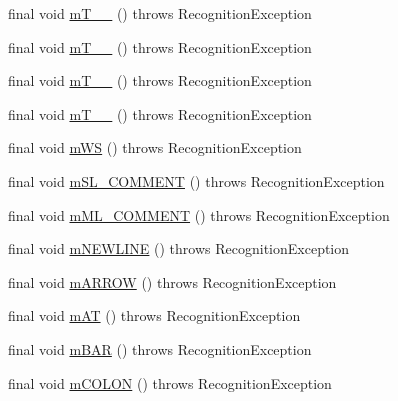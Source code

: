 \begin{DoxyCompactItemize}
\item 
final void \hyperlink{classorg_1_1tzi_1_1use_1_1parser_1_1testsuite_1_1_test_suite_lexer_a8580bb79c6cf585e638fa8e1e931825b}{m\-T\-\_\-\-\_} ()  throws Recognition\-Exception 
\item 
final void \hyperlink{classorg_1_1tzi_1_1use_1_1parser_1_1testsuite_1_1_test_suite_lexer_a0285d18094fc66d87d8b0c697b28322c}{m\-T\-\_\-\-\_} ()  throws Recognition\-Exception 
\item 
final void \hyperlink{classorg_1_1tzi_1_1use_1_1parser_1_1testsuite_1_1_test_suite_lexer_af7ef6e8c1e24f2d0256b18cd6e56e66d}{m\-T\-\_\-\-\_} ()  throws Recognition\-Exception 
\item 
final void \hyperlink{classorg_1_1tzi_1_1use_1_1parser_1_1testsuite_1_1_test_suite_lexer_add4da92fd7dff7f9ee91573342c16a82}{m\-T\-\_\-\-\_} ()  throws Recognition\-Exception 
\item 
final void \hyperlink{classorg_1_1tzi_1_1use_1_1parser_1_1testsuite_1_1_test_suite_lexer_a5ad3d09f1f423e5a28e356a176d5fdcb}{m\-W\-S} ()  throws Recognition\-Exception 
\item 
final void \hyperlink{classorg_1_1tzi_1_1use_1_1parser_1_1testsuite_1_1_test_suite_lexer_a500d1a953cf0edbd2af3a46c8890343c}{m\-S\-L\-\_\-\-C\-O\-M\-M\-E\-N\-T} ()  throws Recognition\-Exception 
\item 
final void \hyperlink{classorg_1_1tzi_1_1use_1_1parser_1_1testsuite_1_1_test_suite_lexer_a4d4beff637cb8483b13a5ece817d42e5}{m\-M\-L\-\_\-\-C\-O\-M\-M\-E\-N\-T} ()  throws Recognition\-Exception 
\item 
final void \hyperlink{classorg_1_1tzi_1_1use_1_1parser_1_1testsuite_1_1_test_suite_lexer_aaef0ebddd8da1091b2d4c064e8d4b009}{m\-N\-E\-W\-L\-I\-N\-E} ()  throws Recognition\-Exception 
\item 
final void \hyperlink{classorg_1_1tzi_1_1use_1_1parser_1_1testsuite_1_1_test_suite_lexer_a9103fe0afb04a15d8f91ed023755303d}{m\-A\-R\-R\-O\-W} ()  throws Recognition\-Exception 
\item 
final void \hyperlink{classorg_1_1tzi_1_1use_1_1parser_1_1testsuite_1_1_test_suite_lexer_a91d7953c21acab0e263bca25f5b4f394}{m\-A\-T} ()  throws Recognition\-Exception 
\item 
final void \hyperlink{classorg_1_1tzi_1_1use_1_1parser_1_1testsuite_1_1_test_suite_lexer_a0c903e46bed5893f8963615ca9cf6e11}{m\-B\-A\-R} ()  throws Recognition\-Exception 
\item 
final void \hyperlink{classorg_1_1tzi_1_1use_1_1parser_1_1testsuite_1_1_test_suite_lexer_a7ca6b019f412c75afe164974749c3cc2}{m\-C\-O\-L\-O\-N} ()  throws Recognition\-Exception 

\end{DoxyCompactItemize}
